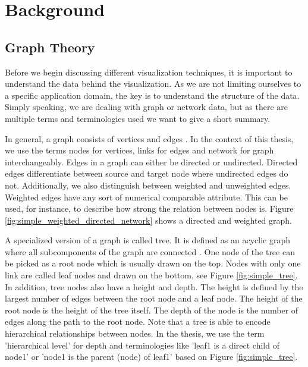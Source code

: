 \chapter{Background}

\section{Graph Theory}

Before we begin discussing different visualization techniques, it is important to understand the data behind the visualization. As we are not limiting ourselves to a specific application domain, the key is to understand the structure of the data. Simply speaking, we are dealing with graph or network data, but as there are multiple terms and terminologies used we want to give a short summary. 

In general, a graph consists of vertices and edges \cite{diestel_graph_2017}. In the context of this thesis, we use the terms nodes for vertices, links for edges and network for graph interchangeably. Edges in a graph can either be directed or undirected. Directed edges differentiate between source and target node where undirected edges do not. Additionally, we also distinguish between weighted and unweighted edges. Weighted edges have any sort of numerical comparable attribute. This can be used, for instance, to describe how strong the relation between nodes is. Figure \ref{fig:simple_weighted_directed_network} shows a directed and weighted graph.

A specialized version of a graph is called tree\label{exp:tree}. It is defined as an acyclic graph where all subcomponents of the graph are connected \cite{diestel_graph_2017}. One node of the tree can be picked as a root node which is usually drawn on the top. Nodes with only one link are called leaf nodes and drawn on the bottom, see Figure \ref{fig:simple_tree}.\\
In addition, tree nodes also have a height and depth. The height is defined by the largest number of edges between the root node and a leaf node. The height of the root node is the height of the tree itself. The depth of the node is the number of edges along the path to the root node. Note that a tree is able to encode hierarchical relationships between nodes. In the thesis, we use the term 'hierarchical level' for depth and terminologies like 'leaf1 is a direct child of node1' or 'node1 is the parent (node) of leaf1' based on Figure \ref{fig:simple_tree}.

